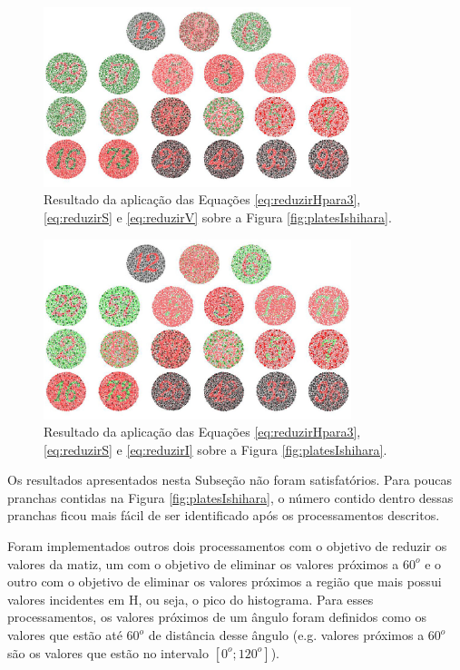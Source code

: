 \documentclass[	12pt, Times, openright, twoside, a4paper, english, brazil]{abntex2}
\begin{document}
\begin{figure}[!htb]
\centering \includegraphics[width=0.80\textwidth]{figuraDeslocarHSeV.jpg}
\caption{Resultado da aplicação das Equações \ref{eq:reduzirHpara3}, \ref{eq:reduzirS} e \ref{eq:reduzirV} sobre a Figura \ref{fig:platesIshihara}. \label{fig:reduzirHSeV}}
\end{figure}

\begin{figure}[!htb]
\centering \includegraphics[width=0.80\textwidth]{figuraDeslocarHSeI.jpg}
\caption{Resultado da aplicação das Equações \ref{eq:reduzirHpara3}, \ref{eq:reduzirS} e \ref{eq:reduzirI} sobre a Figura \ref{fig:platesIshihara}. \label{fig:reduzirHSeI}}
\end{figure}

Os resultados apresentados nesta Subseção não foram satisfatórios. Para poucas pranchas contidas na Figura \ref{fig:platesIshihara}, o número contido dentro dessas pranchas ficou mais fácil de ser identificado após os processamentos descritos. 

Foram implementados outros dois processamentos com o objetivo de reduzir os valores da matiz, um com o objetivo de eliminar os valores próximos a $60^o$ e o outro com o objetivo de eliminar os valores próximos a região que mais possui valores incidentes em H, ou seja, o pico do histograma. Para esses processamentos, os valores próximos de um ângulo foram definidos como os valores que estão até $60^o$ de distância desse ângulo (e.g. valores próximos a $60^o$ são os valores que estão no intervalo $[0^o;120^o]$).
\end{document}
